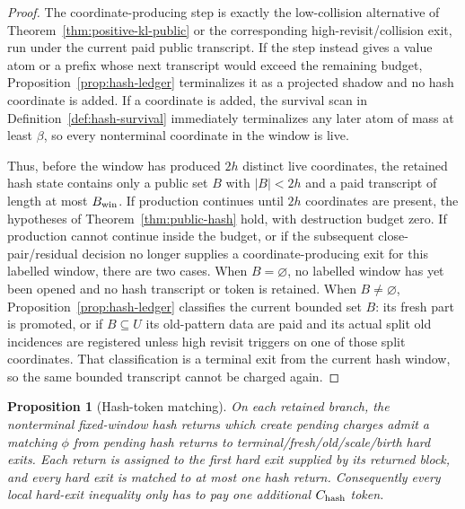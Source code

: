 \documentclass[11pt]{article}
\newtheorem{proposition}[theorem]{Proposition}
\begin{document}
\begin{proof}
The coordinate-producing step is exactly the low-collision alternative of
Theorem~\ref{thm:positive-kl-public} or the corresponding high-revisit/collision
exit, run under the current paid public transcript.  If the step instead gives
a value atom or a prefix whose next transcript would exceed the remaining
budget, Proposition~\ref{prop:hash-ledger} terminalizes it as a projected
shadow and no hash coordinate is added.  If a coordinate is added, the
survival scan in Definition~\ref{def:hash-survival} immediately terminalizes
any later atom of mass at least $\beta$, so every nonterminal coordinate in the
window is live.

Thus, before the window has produced $2h$ distinct live coordinates, the
retained hash state contains only a public set $B$ with $|B|<2h$ and a paid
transcript of length at most $B_{\rm win}$.  If production continues until
$2h$ coordinates are present, the hypotheses of Theorem~\ref{thm:public-hash}
hold, with destruction budget zero.  If production cannot continue inside the
budget, or if the subsequent close-pair/residual decision no longer supplies a
coordinate-producing exit for this labelled window, there are two cases.  When
$B=\varnothing$, no labelled window has yet been opened and no hash transcript
or token is retained.  When $B\ne\varnothing$,
Proposition~\ref{prop:hash-ledger} classifies the current bounded set $B$: its
fresh part is promoted, or if $B\subseteq U$ its old-pattern data are paid and
its actual split old incidences are registered unless high revisit triggers on
one of those split coordinates.  That classification is a terminal exit from the
current hash window, so the same bounded transcript cannot be charged again.
\end{proof}

\begin{proposition}[Hash-token matching]
\label{prop:hash-token-matching}
On each retained branch, the nonterminal fixed-window hash returns which create
pending charges admit a matching $\phi$ from pending hash returns to
terminal/fresh/old/scale/birth hard exits.  Each return is assigned to the first
hard exit supplied by its returned block, and every hard exit is matched to at
most one hash return.  Consequently every local hard-exit inequality only has
to pay one additional $C_{\rm hash}$ token.
\end{proposition}
\end{document}
